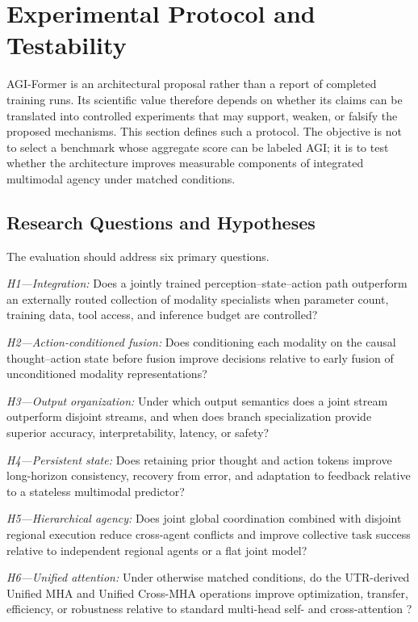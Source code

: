 \section{\textbf{Experimental Protocol and Testability}}

AGI-Former is an architectural proposal rather than a report of completed training runs. Its scientific value therefore depends on whether its claims can be translated into controlled experiments that may support, weaken, or falsify the proposed mechanisms. This section defines such a protocol. The objective is not to select a benchmark whose aggregate score can be labeled AGI; it is to test whether the architecture improves measurable components of integrated multimodal agency under matched conditions.

\subsection{\textbf{Research Questions and Hypotheses}}

The evaluation should address six primary questions.

\textit{H1---Integration:} Does a jointly trained perception--state--action path outperform an externally routed collection of modality specialists when parameter count, training data, tool access, and inference budget are controlled?

\textit{H2---Action-conditioned fusion:} Does conditioning each modality on the causal thought--action state before fusion improve decisions relative to early fusion of unconditioned modality representations?

\textit{H3---Output organization:} Under which output semantics does a joint stream outperform disjoint streams, and when does branch specialization provide superior accuracy, interpretability, latency, or safety?

\textit{H4---Persistent state:} Does retaining prior thought and action tokens improve long-horizon consistency, recovery from error, and adaptation to feedback relative to a stateless multimodal predictor?

\textit{H5---Hierarchical agency:} Does joint global coordination combined with disjoint regional execution reduce cross-agent conflicts and improve collective task success relative to independent regional agents or a flat joint model?

\textit{H6---Unified attention:} Under otherwise matched conditions, do the UTR-derived Unified MHA and Unified Cross-MHA operations improve optimization, transfer, efficiency, or robustness relative to standard multi-head self- and cross-attention \cite{zohourian2026utr}?

